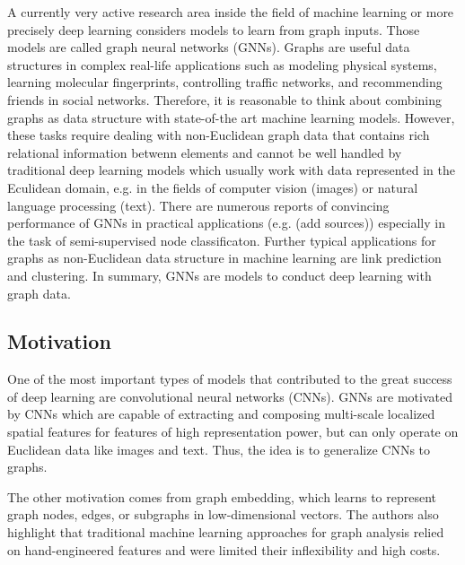 \documentclass[a4paper,preprint]{sig-alternate}
\begin{document}
A currently very active research area inside the field of machine learning or more precisely deep learning considers models to learn
from graph inputs. Those models are called graph neural networks (GNNs). Graphs are useful data structures in complex real-life
applications such as modeling physical systems, learning molecular fingerprints, controlling traffic networks, and recommending 
friends in social networks.\cite{article}
Therefore, it is reasonable to think about combining graphs as data structure with state-of-the art machine learning models.
However, these tasks require dealing with non-Euclidean graph data that contains rich relational information betwenn elements and
cannot be well handled by traditional deep learning models which usually work with data represented in the Eculidean domain, e.g. in the
fields of computer vision (images) or natural language processing (text).\cite{article}\newline
There are numerous reports of convincing performance of GNNs in practical applications (e.g. (add sources))
especially in the task of semi-supervised node classificaton.\cite{xu2019topology}
Further typical applications for graphs as non-Euclidean data structure in machine learning are link prediction and clustering.\cite{zhou2019graph}\newline
In summary, GNNs are models to conduct deep learning with graph data.\newline

\subsection{Motivation}

One of the most important types of models that contributed to the great success of deep learning are convolutional neural networks (CNNs).
GNNs are motivated by CNNs which are capable of extracting and composing multi-scale localized spatial features
for features of high representation power, but can only operate on Euclidean data like images and text.\cite{article}
Thus, the idea is to generalize CNNs to graphs.\newline

The other motivation comes from graph embedding, which learns to represent graph nodes, edges, or subgraphs in low-dimensional vectors.\cite{article}
The authors also highlight that traditional machine learning approaches for graph analysis relied on hand-engineered features and were limited their
inflexibility and high costs.\newline
\end{document}
